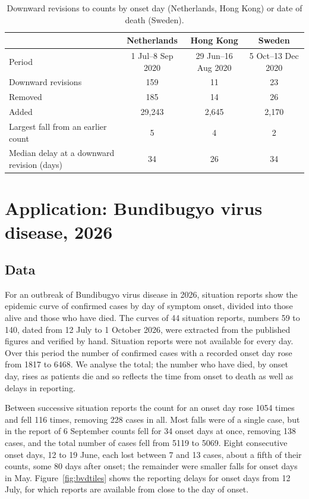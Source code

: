 \documentclass[11pt,a4paper]{article}
\begin{document}
\begin{table}[h]
\centering
\begin{tabular}{lccc}
\toprule
 & Netherlands & Hong Kong & Sweden \\
\midrule
Period & 1 Jul--8 Sep 2020 & 29 Jun--16 Aug 2020 & 5 Oct--13 Dec 2020 \\
Downward revisions & 159 & 11 & 23 \\
Removed & 185 & 14 & 26 \\
Added & 29{,}243 & 2{,}645 & 2{,}170 \\
Largest fall from an earlier count & 5 & 4 & 2 \\
Median delay at a downward revision (days) & 34 & 26 & 34 \\
\bottomrule
\end{tabular}
\caption{Downward revisions to counts by onset day (Netherlands, Hong Kong) or
date of death (Sweden).}
\label{tab:realrevisions}
\end{table}

\section{Application: Bundibugyo virus disease, 2026}\label{sec:bvd}

\subsection{Data}

For an outbreak of Bundibugyo virus disease in 2026, situation reports show the
epidemic curve of confirmed cases by day of symptom onset, divided into those
alive and those who have died. The curves of 44 situation reports, numbers 59
to 140, dated from 12 July to 1 October 2026, were extracted from the published
figures and verified by hand. Situation reports were not available for every
day. Over this period the number of confirmed cases with a recorded onset day
rose from 1817 to 6468. We analyse the total; the number who have died, by
onset day, rises as patients die and so reflects the time from onset to death
as well as delays in reporting.

Between successive situation reports the count for an onset day rose 1054
times and fell 116 times, removing 228 cases in all. Most falls were of a
single case, but in the report of 6 September counts fell for 34 onset days at
once, removing 138 cases, and the total number of cases fell from 5119 to
5069. Eight consecutive onset days, 12 to 19 June, each lost between 7 and 13
cases, about a fifth of their counts, some 80 days after onset; the remainder
were smaller falls for onset days in May. Figure~\ref{fig:bvdtiles} shows the
reporting delays for onset days from 12 July, for which reports are available
from close to the day of onset.
\end{document}
